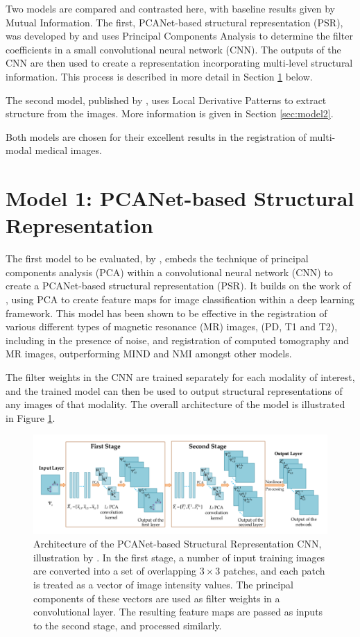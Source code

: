 \documentclass{report}
\begin{document}
Two models are compared and contrasted here, with baseline results given by Mutual Information. The first, PCANet-based structural representation (PSR), was developed by \cite{zhu2018pcanet} and uses Principal Components Analysis to determine the filter coefficients in a small convolutional neural network (CNN). The outputs of the CNN are then used to create a representation incorporating multi-level structural information. This process is described in more detail in Section \ref{sec:model1} below.

The second model, published by \cite{jiang2017fast}, uses Local Derivative Patterns to extract structure from the images. More information is given in Section \ref{sec:model2}.

Both models are chosen for their excellent results in the registration of multi-modal medical images.

\section{Model 1: PCANet-based Structural Representation}
\label{sec:model1}
The first model to be evaluated, by \cite{zhu2018pcanet}, embeds the technique of principal components analysis (PCA) within a convolutional neural network (CNN) to create a PCANet-based structural representation (PSR). It builds on the work of \cite{chan2015pcanet}, using PCA to create feature maps for image classification within a deep learning framework. This model has been shown to be effective in the registration of various different types of magnetic resonance (MR) images, (PD, T1 and T2), including in the presence of noise, and registration of computed tomography and MR images, outperforming MIND and NMI amongst other models.

The filter weights in the CNN are trained separately for each modality of interest, and the trained model can then be used to output structural representations of any images of that modality. The overall architecture of the model is illustrated in Figure \ref{fig:PSR}.

\begin{figure}
\centering
\includegraphics[width=5.5in]{PSR_architecture.pdf}
\caption{Architecture of the PCANet-based Structural Representation CNN, illustration by \cite{zhu2018pcanet}. In the first stage, a number of input training images are converted into a set of overlapping $3\times 3$ patches, and each patch is treated as a vector of image intensity values. The principal components of these vectors are used as filter weights in a convolutional layer. The resulting feature maps are passed as inputs to the second stage, and processed similarly.}
\label{fig:PSR}
\end{figure}
\end{document}
